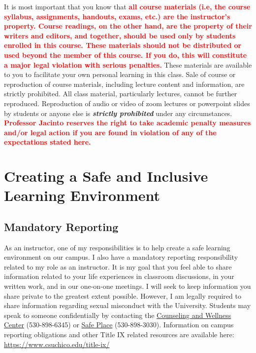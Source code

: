 \documentclass[11pt,]{article}
\begin{document}
It is most important that you know that
\textcolor{red}{\bf{all} course materials (i.e, the course syllabus, assignments, handouts, exams, etc.) are the instructor’s property. Course readings, on the other hand, are the property of their writers and editors, and together, should be used only by students enrolled in this course. These materials should not be distributed or used beyond the member of this course. If you do, this will constitute a major legal violation with serious penalties.}
These materials are available to you to facilitate your own personal
learning in this class. Sale of course or reproduction of course
materials, including lecture content and information, are strictly
prohibited. All class material, particularly lectures, cannot be further
reproduced. Reproduction of audio or video of zoom lectures or
powerpoint slides by students or anyone else is \textbf{\emph{strictly
prohibited}} under any circumstances.
\textcolor{red}{\bf{Professor Jacinto reserves the right to take academic penalty measures and/or legal action if you are found in violation of any of the expectations stated here.}}

\hypertarget{creating-a-safe-and-inclusive-learning-environment}{%
\section{Creating a Safe and Inclusive Learning
Environment}\label{creating-a-safe-and-inclusive-learning-environment}}

\hypertarget{mandatory-reporting}{%
\subsection{Mandatory Reporting}\label{mandatory-reporting}}

As an instructor, one of my responsibilities is to help create a safe
learning environment on our campus. I also have a mandatory reporting
responsibility related to my role as an instructor. It is my goal that
you feel able to share information related to your life experiences in
classroom discussions, in your written work, and in our one-on-one
meetings. I will seek to keep information you share private to the
greatest extent possible. However, I am legally required to share
information regarding sexual misconduct with the University. Students
may speak to someone confidentially by contacting the
\href{https://www.csuchico.edu/counseling/}{Counseling and Wellness
Center} (530-898-6345) or
\href{https://www.csuchico.edu/safeplace/}{Safe Place} (530-898-3030).
Information on campus reporting obligations and other Title IX related
resources are available here: \url{https://www.csuchico.edu/title-ix/}
\end{document}
